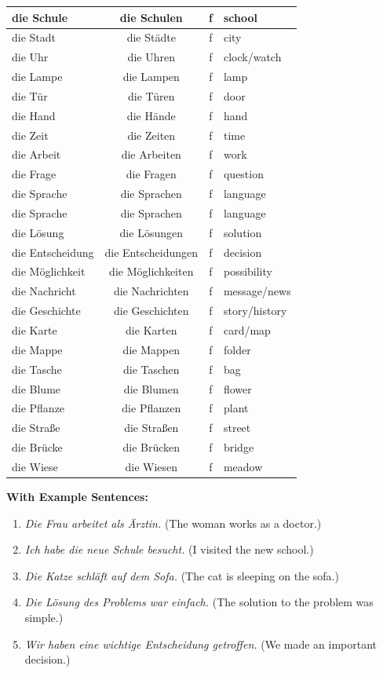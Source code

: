 \begin{center}
\begin{tabular}{|l|c|c|l|}
\hline
die Schule & die Schulen & f & school \\ \hline
die Stadt & die Städte & f & city \\ \hline
die Uhr & die Uhren & f & clock/watch \\ \hline
die Lampe & die Lampen & f & lamp \\ \hline
die Tür & die Türen & f & door \\ \hline
die Hand & die Hände & f & hand \\ \hline
die Zeit & die Zeiten & f & time \\ \hline
die Arbeit & die Arbeiten & f & work \\ \hline
die Frage & die Fragen & f & question \\ \hline
die Sprache & die Sprachen & f & language \\ \hline
die Sprache & die Sprachen & f & language \\ \hline
die Lösung & die Lösungen & f & solution \\ \hline
die Entscheidung & die Entscheidungen & f & decision \\ \hline
die Möglichkeit & die Möglichkeiten & f & possibility \\ \hline
die Nachricht & die Nachrichten & f & message/news \\ \hline
die Geschichte & die Geschichten & f & story/history \\ \hline
die Karte & die Karten & f & card/map \\ \hline
die Mappe & die Mappen & f & folder \\ \hline
die Tasche & die Taschen & f & bag \\ \hline
die Blume & die Blumen & f & flower \\ \hline
die Pflanze & die Pflanzen & f & plant \\ \hline
die Straße & die Straßen & f & street \\ \hline
die Brücke & die Brücken & f & bridge \\ \hline
die Wiese & die Wiesen & f & meadow \\ \hline
\end{tabular}
\end{center}

\bigskip
\noindent\textbf{With Example Sentences:}

\begin{enumerate}
    \item \textit{Die Frau arbeitet als Ärztin.} (The woman works as a doctor.)
    \item \textit{Ich habe die neue Schule besucht.} (I visited the new school.)
    \item \textit{Die Katze schläft auf dem Sofa.} (The cat is sleeping on the sofa.)
    \item \textit{Die Lösung des Problems war einfach.} (The solution to the problem was simple.)
    \item \textit{Wir haben eine wichtige Entscheidung getroffen.} (We made an important decision.)
\end{enumerate}

